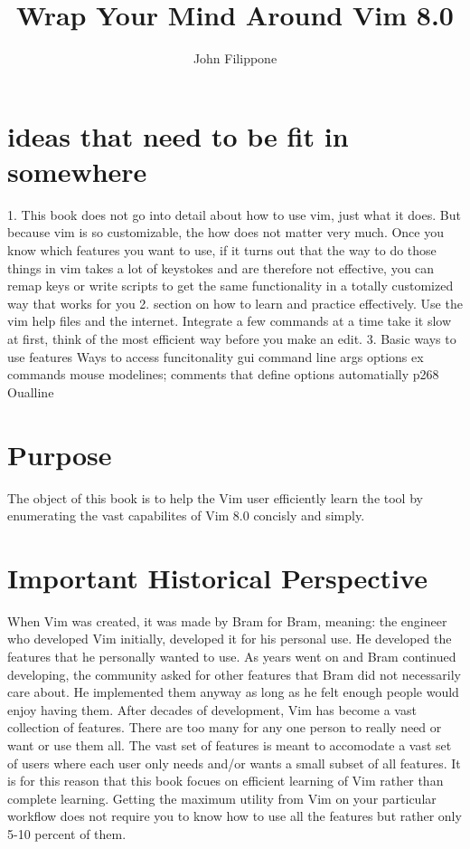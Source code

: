 \documentclass[12pt]{book}
\title{Wrap Your Mind Around Vim 8.0}
\author{John Filippone}
\begin{document}
\maketitle

\section{ideas that need to be fit in somewhere}
1. This book does not go into detail about how to use vim, just what it does.
But because vim is so customizable, the how does not matter very much.
Once you know which features you want to use, if it turns out that the way to do those things in vim takes a lot of keystokes and are therefore
not effective, you can remap keys or write scripts to get the same functionality in a totally customized way that works for you
2. section on how to learn and practice effectively.
Use the vim help files and the internet.
Integrate a few commands at a time take it slow at first, think of the most efficient way before you make an edit.
3. Basic ways to use features
Ways to access funcitonality
  gui
  command line args
  options
  ex commands
  mouse
	modelines; comments that define options automatially p268 Oualline

\section{Purpose}
The object of this book is to help the Vim user efficiently learn the tool by enumerating the vast capabilites of Vim 8.0 concisly and simply.

\section{Important Historical Perspective}
When Vim was created, it was made by Bram for Bram, meaning: the engineer who developed Vim initially, developed it for his personal use.
He developed the features that he personally wanted to use.
As years went on and Bram continued developing, the community asked for other features that Bram did not necessarily care about.
He implemented them anyway as long as he felt enough people would enjoy having them.
After decades of development, Vim has become a vast collection of features.
There are too many for any one person to really need or want or use them all.
The vast set of features is meant to accomodate a vast set of users where each user only needs and/or wants a small subset of all features.
It is for this reason that this book focues on efficient learning of Vim rather than complete learning.
Getting the maximum utility from Vim on your particular workflow does not require you to know how to use all the features but rather only 5-10 percent of them.
\end{document}
